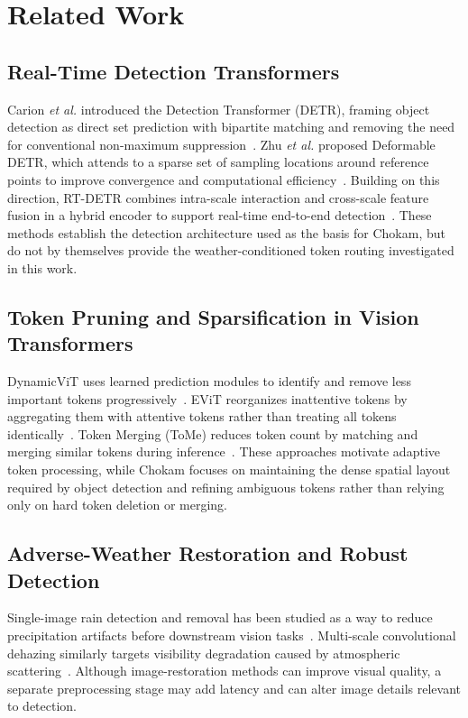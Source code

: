 \documentclass[conference]{IEEEtran}
\begin{document}
\section{Related Work}

\subsection{Real-Time Detection Transformers}
Carion \textit{et al.} introduced the Detection Transformer (DETR), framing object detection as direct set prediction with bipartite matching and removing the need for conventional non-maximum suppression~\cite{carion2020end}. Zhu \textit{et al.} proposed Deformable DETR, which attends to a sparse set of sampling locations around reference points to improve convergence and computational efficiency~\cite{zhu2020deformable}. Building on this direction, RT-DETR combines intra-scale interaction and cross-scale feature fusion in a hybrid encoder to support real-time end-to-end detection~\cite{lv2023detrs}. These methods establish the detection architecture used as the basis for Chokam, but do not by themselves provide the weather-conditioned token routing investigated in this work.

\subsection{Token Pruning and Sparsification in Vision Transformers}
DynamicViT uses learned prediction modules to identify and remove less important tokens progressively~\cite{rao2021dynamicvit}. EViT reorganizes inattentive tokens by aggregating them with attentive tokens rather than treating all tokens identically~\cite{liang2022evit}. Token Merging (ToMe) reduces token count by matching and merging similar tokens during inference~\cite{bolya2022tome}. These approaches motivate adaptive token processing, while Chokam focuses on maintaining the dense spatial layout required by object detection and refining ambiguous tokens rather than relying only on hard token deletion or merging.

\subsection{Adverse-Weather Restoration and Robust Detection}
Single-image rain detection and removal has been studied as a way to reduce precipitation artifacts before downstream vision tasks~\cite{yang2020single}. Multi-scale convolutional dehazing similarly targets visibility degradation caused by atmospheric scattering~\cite{li2019single}. Although image-restoration methods can improve visual quality, a separate preprocessing stage may add latency and can alter image details relevant to detection.
\end{document}
